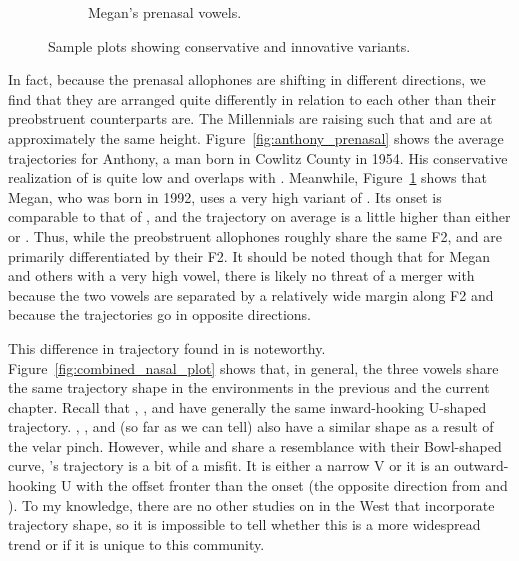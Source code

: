 \begin{figure}[tb!]
\begin{subfigure}[t]{2.925in}
        \caption{Megan's prenasal vowels.}
        \label{fig:megan_prenasal}
    \end{subfigure}
    \hspace{\fill}
    \caption{Sample plots showing conservative and innovative \ban variants.}
    \label{fig:anthony_and_megan}
\end{figure}

In fact, because the prenasal allophones are shifting in different directions, we find that they  are arranged quite differently in relation to each other than their preobstruent counterparts are. The Millennials are raising \ban such that \ban and \ben are at approximately the same height. Figure~\ref{fig:anthony_prenasal} shows the average trajectories for Anthony, a man born in Cowlitz County in 1954. His conservative realization of \ban is quite low and overlaps with \bat. Meanwhile, Figure~\ref{fig:megan_prenasal} shows that Megan, who was born in 1992, uses a very high variant of \ban. Its onset is comparable to that of \face, and the trajectory on average is a little higher than either \bet or \ben. Thus, while the preobstruent allophones roughly share the same F2, \ban and \ben are primarily differentiated by their F2. It should be noted though that for Megan and others with a very high \ban vowel, there is likely no threat of a merger with \ben because the two vowels are separated by a relatively wide margin along F2 and because the trajectories go in opposite directions.

This difference in trajectory found in \ben is noteworthy. Figure~\ref{fig:combined_nasal_plot} shows that, in general, the three vowels share the same trajectory shape in the environments in the previous and the current chapter. Recall that \bat, \bet, and \bit have generally the same inward-hooking U-shaped trajectory. \bang, \bing, and (so far as we can tell) \beng also have a similar shape as a result of the velar pinch. However, while \ban and \bin share a resemblance with their Bowl-shaped curve, \ben's trajectory is a bit of a misfit. It is either a narrow V or it is an outward-hooking U with the offset fronter than the onset (the opposite direction from \ban and \bin). To my knowledge, there are no other studies on \ben in the West that incorporate trajectory shape, so it is impossible to tell whether this is a more widespread trend or if it is unique to this community.

